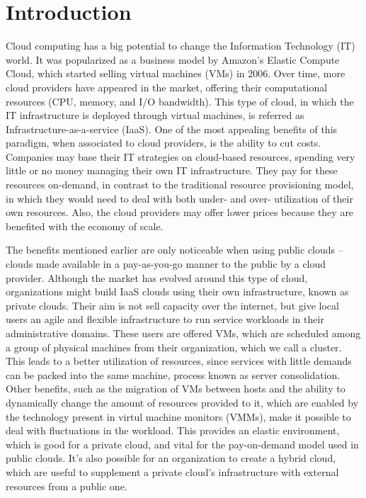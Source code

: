 \chapter{\textbf{Introduction}}

\label{Introduction}

Cloud computing has a big potential to change the Information Technology (IT) world. It was popularized as a business model by Amazon's Elastic Compute Cloud, which started selling virtual machines (VMs) in 2006. Over time, more cloud providers have appeared in the market, offering their computational resources (CPU, memory, and I/O bandwidth). This type of cloud, in which the IT infrastructure is deployed through virtual machines, is referred as Infrastructure-as-a-service (IaaS). One of the most appealing benefits of this paradigm, when associated to cloud providers, is the ability to cut costs. Companies may base their IT strategies on cloud-based resources, spending very little or no money managing their own IT infrastructure. They pay for these resources on-demand, in contrast to the traditional resource provisioning model, in which they would need to deal with both under- and over- utilization of their own resources. Also, the cloud providers may offer lower prices because they are benefited with the economy of scale.


The benefits mentioned earlier are only noticeable when using public clouds -- clouds made available in a pay-as-you-go manner to the public by a cloud provider. Although the market has evolved around this type of cloud, organizations might build IaaS clouds using their own infrastructure, known as private clouds. Their aim is not sell capacity  over the internet,  but give local users an agile and flexible infrastructure to run service workloads in their administrative domains. These users are offered VMs, which are scheduled among a group of physical machines from their organization, which we call a cluster. This leads to a better utilization of resources, since services with little demands can be packed into the same machine, process known as server consolidation. Other benefits, such as the migration of VMs between hosts and the ability to dynamically change the amount of resources provided to it, which are enabled by the  technology present in virtul machine monitors (VMMs), make it possible to deal with fluctuations in the workload. This provides an elastic environment, which is good for a private cloud, and vital for the pay-on-demand model used in public clouds.  It's also possible for an organization to create a hybrid cloud,  which are useful to supplement a private cloud's infrastructure with external resources from a public one. 

